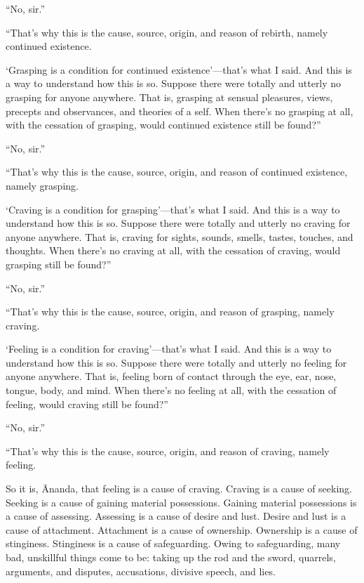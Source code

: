 \documentclass[12pt,openany]{book}%
\begin{document}
“No, sir.” 

“That’s why this is the cause, source, origin, and reason of rebirth, namely continued existence. 

‘Grasping is a condition for continued existence’—that’s what I said. And this is a way to understand how this is so. Suppose there were totally and utterly no grasping for anyone anywhere. That is, grasping at sensual pleasures, views, precepts and observances, and theories of a self. When there’s no grasping at all, with the cessation of grasping, would continued existence still be found?” 

“No, sir.” 

“That’s why this is the cause, source, origin, and reason of continued existence, namely grasping. 

‘Craving is a condition for grasping’—that’s what I said. And this is a way to understand how this is so. Suppose there were totally and utterly no craving for anyone anywhere. That is, craving for sights, sounds, smells, tastes, touches, and thoughts. When there’s no craving at all, with the cessation of craving, would grasping still be found?” 

“No, sir.” 

“That’s why this is the cause, source, origin, and reason of grasping, namely craving. 

‘Feeling is a condition for craving’—that’s what I said. And this is a way to understand how this is so. Suppose there were totally and utterly no feeling for anyone anywhere. That is, feeling born of contact through the eye, ear, nose, tongue, body, and mind. When there’s no feeling at all, with the cessation of feeling, would craving still be found?” 

“No, sir.” 

“That’s why this is the cause, source, origin, and reason of craving, namely feeling. 

So it is, Ānanda, that feeling is a cause of craving. Craving is a cause of seeking. Seeking is a cause of gaining material possessions. Gaining material possessions is a cause of assessing. Assessing is a cause of desire and lust. Desire and lust is a cause of attachment. Attachment is a cause of ownership. Ownership is a cause of stinginess. Stinginess is a cause of safeguarding. Owing to safeguarding, many bad, unskillful things come to be: taking up the rod and the sword, quarrels, arguments, and disputes, accusations, divisive speech, and lies. 
\end{document}
